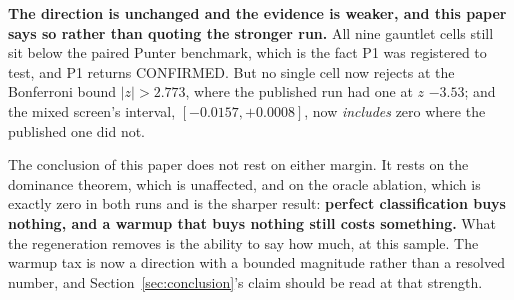 \documentclass[11pt]{article}
\begin{document}
\textbf{The direction is unchanged and the evidence is weaker, and this paper says so rather than
quoting the stronger run.} All nine gauntlet cells still sit below the paired Punter benchmark,
which is the fact P1 was registered to test, and P1 returns CONFIRMED. But no single cell now
rejects at the Bonferroni bound $|z| > 2.773$, where the published run had one at $z$ $-3.53$; and
the mixed screen's interval, $[-0.0157, +0.0008]$, now \emph{includes} zero where the published
one did not.

The conclusion of this paper does not rest on either margin. It rests on the dominance theorem,
which is unaffected, and on the oracle ablation, which is exactly zero in both runs and is the
sharper result: \textbf{perfect classification buys nothing, and a warmup that buys nothing still
costs something.} What the regeneration removes is the ability to say how much, at this sample.
The warmup tax is now a direction with a bounded magnitude rather than a resolved number, and
Section~\ref{sec:conclusion}'s claim should be read at that strength.
\end{document}
